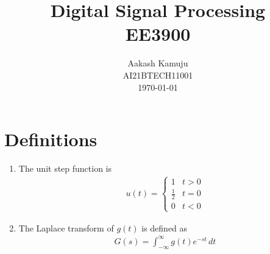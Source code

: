 \documentclass[journal,12pt,twocolumn]{IEEEtran}
\numberwithin{equation}{section}
\renewcommand\thesection{\arabic{section}}
\begin{document}
                             
\title{ Digital Signal Processing  \\ 
	\Large EE3900
}
\author{Aakash Kamuju \\ \normalsize AI21BTECH11001 \\ \vspace*{20pt} \normalsize \today  }
 \maketitle 
 \tableofcontents
 \section{Definitions}
\begin{enumerate}[label=\arabic*.,ref=\thesection.\theenumi]
\item The unit step function is 
\begin{align}
\label{eq:unit-step}
u(t) =
\begin{cases}
1 & t > 0
\\
	\frac{1}{2} & t = 0
\\
0 & t < 0
\end{cases}
\end{align}
\item The Laplace transform of $g(t)$ is defined as 
\begin{align}
	G(s) = \int_{-\infty}^{\infty} g(t) e^{-st}\, dt
\end{align}
 \end{enumerate}
\end{document}
